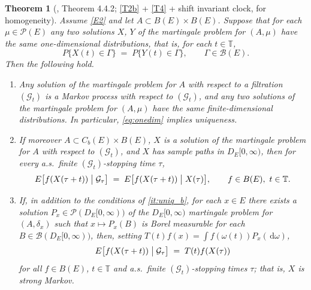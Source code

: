 \documentclass[11pt,a4paper]{article}
\theoremstyle{plain}
\newtheorem{theorem}{Theorem}[section]
\theoremstyle{definition}
\theoremstyle{remark}
\newcommand{\T}{\mathbb{T}}                     %
\newcommand{\Bor}{\mathcal{B}}                 %
\newcommand{\Bdd}{B}                           %
\newcommand{\Cb}{C_b}                          %
\newcommand{\Prob}{\mathcal{P}}                %
\newcommand{\DE}{D_E[0,\infty)}
\newcommand{\Gilt}{\mathcal{G}}
\newcommand{\dif}{\,\mathrm{d}}
\newcommand{\EK}{\cite{EK86}}
\begin{document}
\begin{theorem}[\EK, Theorem 4.4.2; \eqref{T2b} + \eqref{T4} + shift invariant clock, for homogeneity]
  \label{thm:uniqueness}
  Assume \eqref{E2} and let $A \subset \Bdd(E) \times \Bdd(E)$.  Suppose that
  for each $\mu \in \Prob(E)$ any two solutions $X$, $Y$ of the martingale
  problem for $(A,\mu)$ have the same one-dimensional distributions, that is,
  for each $t \in \T$,
  \begin{equation}
    \label{eq:onedim}
    P\{X(t) \in \Gamma\} \;=\; P\{Y(t) \in \Gamma\},
    \qquad \Gamma \in \Bor(E) .
  \end{equation}
  Then the following hold.
  \begin{enumerate}[label=(\alph*)]
  \item \label{it:uniq_a}
    Any solution of the martingale problem for $A$ with respect to a filtration
    $(\Gilt_t)$ is a Markov process with respect to $(\Gilt_t)$, and any two
    solutions of the martingale problem for $(A,\mu)$ have the same
    finite-dimensional distributions.  In particular, \eqref{eq:onedim} implies
    uniqueness.
  \item \label{it:uniq_b}
    If moreover $A \subset \Cb(E) \times \Bdd(E)$, $X$ is a solution of the
    martingale problem for $A$ with respect to $(\Gilt_t)$, and $X$ has sample
    paths in $\DE$, then for every a.s.\ finite $(\Gilt_t)$-stopping time $\tau$,
    \begin{equation}
      \label{eq:strongmarkov}
      E\bigl[ f(X(\tau + t)) \bigm| \Gilt_\tau \bigr]
        \;=\; E\bigl[ f(X(\tau + t)) \bigm| X(\tau) \bigr] ,
      \qquad f \in \Bdd(E),\ t \in \T .
    \end{equation}
  \item \label{it:uniq_c}
    If, in addition to the conditions of \ref{it:uniq_b}, for each $x \in E$
    there exists a solution $P_x \in \Prob(\DE)$ of the $\DE$ martingale problem
    for $(A,\delta_x)$ such that $x \mapsto P_x(B)$ is Borel measurable for each
    $B \in \Bor(\DE)$, then, setting
    $T(t) f(x) = \int f(\omega(t)) P_x(\dif\omega)$,
    \begin{equation}
      \label{eq:strongmarkov2}
      E\bigl[ f(X(\tau + t)) \bigm| \Gilt_\tau \bigr] \;=\; T(t) f(X(\tau))
    \end{equation}
    for all $f \in \Bdd(E)$, $t \in \T$ and a.s.\ finite $(\Gilt_t)$-stopping
    times $\tau$; that is, $X$ is strong Markov.
  \end{enumerate}
\end{theorem}
\end{document}
